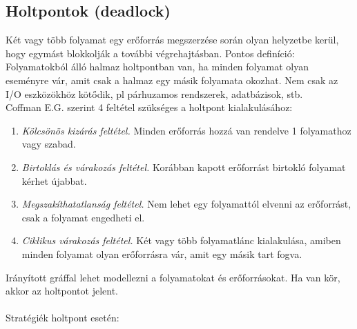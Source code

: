 \documentclass[margin=0px]{article}
\begin{document}
	\subsection{Holtpontok (deadlock)}
	
	Két vagy több folyamat egy erőforrás megszerzése során olyan helyzetbe kerül, hogy egymást blokkolják a további végrehajtásban. Pontos definíció: Folyamatokból álló halmaz holtpontban van, ha minden folyamat olyan eseményre vár, amit csak a halmaz egy másik folyamata okozhat. Nem csak az I/O eszközökhöz kötődik, pl párhuzamos rendszerek, adatbázisok, stb. \\
	Coffman E.G. szerint 4 feltétel szükséges a holtpont kialakulásához:
	\begin{enumerate}
		\item \textit{Kölcsönös kizárás feltétel.} Minden erőforrás hozzá van rendelve 1 folyamathoz vagy szabad.
		\item \textit{Birtoklás és várakozás feltétel.} Korábban kapott erőforrást birtokló folyamat kérhet újabbat.
		\item \textit{Megszakíthatatlanság feltétel.} Nem lehet egy folyamattól elvenni az erőforrást, csak a folyamat engedheti el.
		\item \textit{Ciklikus várakozás feltétel.} Két vagy több folyamatlánc kialakulása, amiben minden folyamat olyan erőforrásra vár, amit egy másik tart fogva.
	\end{enumerate}
	Irányított gráffal lehet modellezni a folyamatokat és erőforrásokat. Ha van kör, akkor az holtpontot jelent. \\ \\
	Stratégiék holtpont esetén:
\end{document}
